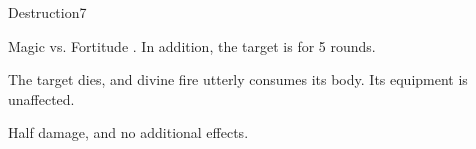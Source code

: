\begin{spellsection}{Destruction}{7}
    \begin{spellheader}
    \end{spellheader}
    \begin{spellcontent}
        \begin{spelltargetinginfo}
        \end{spelltargetinginfo}
        \begin{spelleffects}
            \begin{spellattack}{Magic vs. Fortitude}
                \spellsuccess {}. In addition, the target is \staggered for 5 rounds.

                \spellcritical The target dies, and divine fire utterly consumes its body. Its equipment is unaffected.

                \spellfailure Half damage, and no additional effects.
            \end{spellattack}
        \end{spelleffects}
    \end{spellcontent}
    \begin{spellfooter}
        \miscastrandom
    \end{spellfooter}
\end{spellsection}

